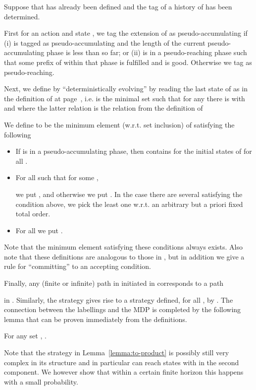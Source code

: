 \documentclass[a4paper,UKenglish]{lipics}
\begin{document}
Suppose that  has already been defined and the tag of a history  of  has been determined. 

First for an action  and state , we tag the extension  of  as pseudo-accumulating if (i)
 is tagged as pseudo-accumulating and the length of the current pseudo-accumulating phase is less than  so far; or (ii)
 is in a pseudo-reaching phase such that some prefix of  within that phase is fulfilled
and  is good.
Otherwise we tag  as pseudo-reaching.

Next, we define  by ``deterministically evolving'' by reading the last state of  as in the definition of  at page~\pageref{page:det-evolv}, i.e.  is the minimal set such that for any  there is  with  and  where the latter relation is the relation from the definition of 

We define  to be the minimum element (w.r.t. set inclusion) of  satisfying the following
\begin{itemize}
	\item If  is in a pseudo-accumulating phase, then  contains  for the initial states  of  for all .
	\item For all  such that for some ,

		we put , and otherwise we put . In the case there are several 
		satisfying the condition above, we pick the least one w.r.t. an arbitrary but a priori fixed total order.
	\item For all  we put .
\end{itemize}
Note that the minimum element satisfying these conditions always exists. Also note that these definitions are analogous to those in , but in addition we give a rule for ``committing'' to an accepting condition.

Finally, any (finite or infinite) path  in  initiated in  corresponds to a path

in . Similarly, the strategy  gives rise to a strategy  defined, for all , by
.
The connection between the labellings and the MDP  is completed by the following lemma that can be proven immediately from the definitions.

\begin{lemma}\label{lemma:to-product}
	
	For any set ,
	.
\end{lemma}

Note that the strategy  in Lemma~\ref{lemma:to-product} is possibly still very complex in
its structure and in particular can reach states with  in the second component. We however show that within a certain finite horizon
this happens with a small probability.
\end{document}

